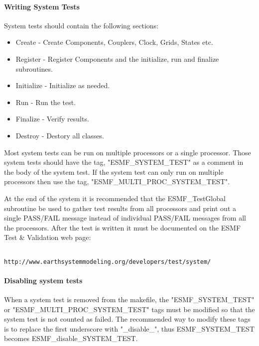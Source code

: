 \paragraph{Writing System Tests}

System tests should contain the following sections:
\begin{itemize}
\item Create - Create Components, Couplers, Clock, Grids, States etc.
\item Register - Register Components and the initialize, run and finalize subroutines.
\item Initialize - Initialize as needed.
\item Run - Run the test.
\item Finalize - Verify results.
\item Destroy - Destory all classes.
\end{itemize}

Most system tests can be run on multiple processors or a single processor. Those system tests should
have the tag, "ESMF\_SYSTEM\_TEST" as a comment in the body of the system test. If the system test
can only run on multiple processors then use the tag, "ESMF\_MULTI\_PROC\_SYSTEM\_TEST".

At the end of the system it is recommended that the ESMF\_TestGlobal subroutine be used to gather
test results from all processors and print out a single PASS/FAIL message instead
of individual PASS/FAIL messages from all the processors.
After the test is written it must be documented on the ESMF Test \& Validation
web page:

\begin{verbatim}

http://www.earthsystemmodeling.org/developers/test/system/

\end{verbatim}


\begin{sloppypar}
\paragraph{Disabling system tests}
When a system test is removed from the makefile, the "ESMF\_SYSTEM\_TEST" or 
"ESMF\_MULTI\_PROC\_SYSTEM\_TEST"
tags must be modified so that the system test is not counted as failed. 
The recommended way to modify these tags is to replace the first underscore with "\_disable\_", thus 
ESMF\_SYSTEM\_TEST becomes 
ESMF\_disable\_SYSTEM\_TEST.
\end{sloppypar}

